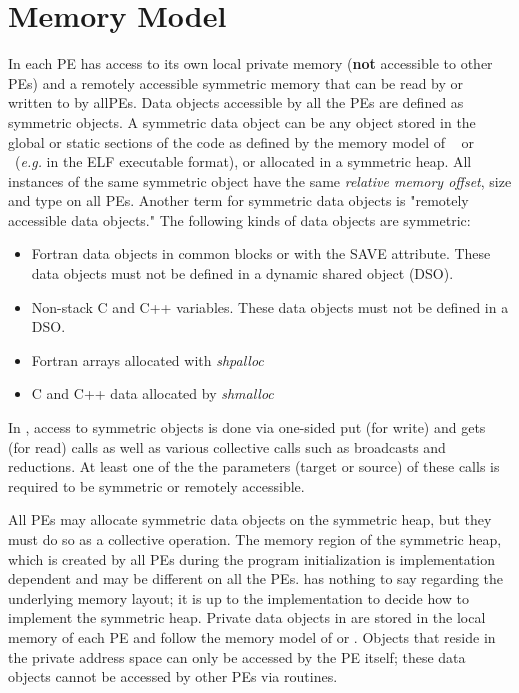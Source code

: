 \section{Memory Model}

In \openshmem{} each \ac{PE} has access to its own local private memory (\textbf{not} accessible to other PEs) and  a remotely accessible symmetric memory that 
can be read by or written to by all\ac{PE}s. Data objects accessible by all the \ac{PE}s are defined as symmetric objects.
A  symmetric data object can be any object stored in the global or static sections of the code as defined by the memory model of ~\Clang{} or ~\Fortran (\emph{e.g.} in the ELF executable format), or allocated in a symmetric heap.  All instances of the same symmetric object have the same \textit{relative memory offset}, size and type on all \ac{PE}s. 
Another term  for  symmetric data objects is "remotely accessible data objects."  The following kinds of data objects are symmetric:
\begin{itemize}
  \item Fortran data objects in common blocks or with the  SAVE  attribute. These data objects	must not be defined in a dynamic shared object (DSO).
  \item Non-stack C and C++ variables.   These  data	objects must  not  be defined in a DSO.
  \item Fortran arrays allocated with \textit{shpalloc} 
  \item C and C++ data allocated by \textit{shmalloc}
\end{itemize}       

In \openshmem, access to symmetric objects is done via one-sided put (for write) and gets (for read) calls as well as various collective
calls such as broadcasts and reductions.  At least one of the the parameters (target or source) of these calls is required to be symmetric or remotely accessible. 

All \ac{PE}s may allocate symmetric data objects on the symmetric heap, but they must do so as a collective operation. 
The memory region of the symmetric heap, which is created by all \ac{PE}s during the program initialization is implementation dependent and 
may be different on all the \ac{PE}s. \openshmem has nothing
to say regarding the underlying memory layout; it is up to the implementation
to decide how to implement the symmetric heap. Private data objects in \openshmem are stored in the local memory of each \ac{PE} 
and follow the memory model of \Clang{} or \Fortran{}. Objects that reside in the private address space can only be accessed by the PE itself; these data objects
cannot be accessed by other PEs via \openshmem{} routines. 



%


